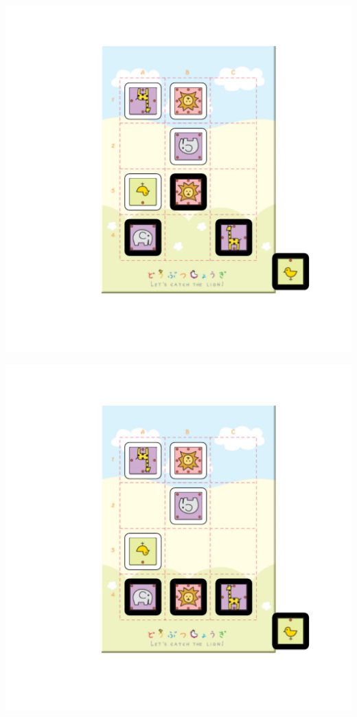 \documentclass{beamer}
\begin{document}
\begin{frame}
\includegraphics[scale = 0.6, clip=true, trim=1in 1in 0in 0.5in]{example4.pdf}
\end{frame}
\begin{frame}
\includegraphics[scale = 0.6, clip=true, trim=1in 1in 0in 0.5in]{example5.pdf}
\end{frame}
\end{document}
